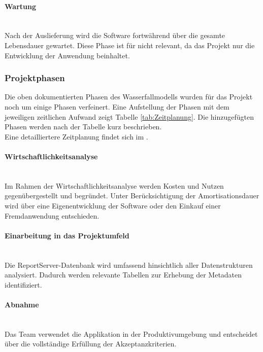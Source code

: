 \paragraph{Wartung} ~\\
\label{p:Wartung}
Nach der Auslieferung wird die Software fortwährend über die gesamte Lebensdauer gewartet. Diese Phase ist für \projektName nicht relevant, da das Projekt nur die Entwicklung der Anwendung beinhaltet.

\subsubsection{Projektphasen}
\label{sec:Projektphasen}
Die oben dokumentierten Phasen des Wasserfallmodells wurden für das Projekt noch um einige Phasen verfeinert. Eine Aufstellung der Phasen mit dem jeweiligen zeitlichen Aufwand zeigt Tabelle \ref{tab:Zeitplanung}. Die hinzugefügten Phasen werden nach der Tabelle kurz beschrieben.
\\
Eine detailliertere Zeitplanung findet sich im .

\paragraph{Wirtschaftlichkeitsanalyse} ~\\
\label{p:Wirtschaftlichkeitsanalyse}
Im Rahmen der Wirtschaftlichkeitsanalyse werden Kosten und Nutzen gegenübergestellt und begründet. Unter Berücksichtigung der Amortisationsdauer wird über eine Eigenentwicklung der Software oder den Einkauf einer Fremdanwendung entschieden.

\paragraph{Einarbeitung in das Projektumfeld} ~\\
\label{p:EinarbeitungProjektumfeld}
Die ReportServer-Datenbank wird umfassend hinsichtlich aller Datenstrukturen analysiert. Dadurch werden relevante Tabellen zur Erhebung der Metadaten identifiziert.

\paragraph{Abnahme} ~\\
\label{p:Abnahme}
Das Team \teamName verwendet die Applikation in der Produktivumgebung und entscheidet über die vollständige Erfüllung der Akzeptanzkriterien.

